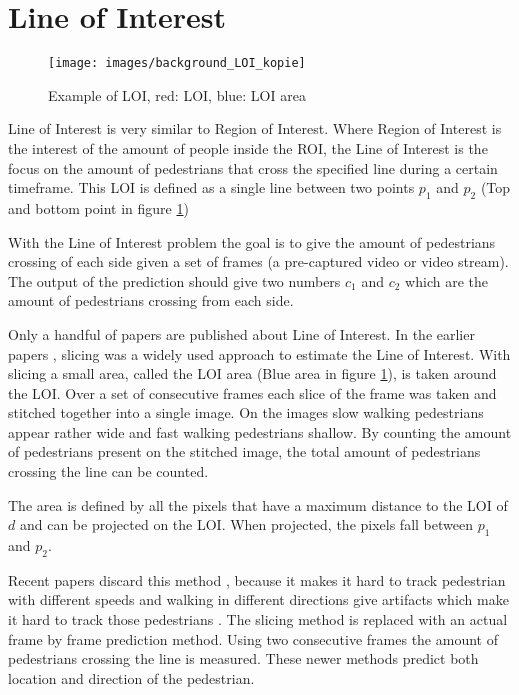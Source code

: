 \section{Line of Interest}
\begin{figure}[h]
\centering
\texttt{[image: images/background\_LOI\_kopie]}
\caption{Example of LOI, red: LOI, blue: LOI area}
\label{fig:loi_example}
\end{figure}

Line of Interest is very similar to Region of Interest. Where Region of Interest is the interest of the amount of people inside the ROI, the Line of Interest is the focus on the amount of pedestrians that cross the specified line during a certain timeframe. This LOI is defined as a single line between two points $p_1$ and $p_2$ (Top and bottom point in figure \ref{fig:loi_example})

With the Line of Interest problem the goal is to give the amount of pedestrians crossing of each side given a set of frames (a pre-captured video or video stream). The output of the prediction should give two numbers $c_1$ and $c_2$ which are the amount of pedestrians crossing from each side.

Only a handful of papers are published about Line of Interest. In the earlier papers \cite{ma_counting_2016, cao_large_2015}, slicing was a widely used approach to estimate the Line of Interest. With slicing a small area, called the LOI area (Blue area in figure \ref{fig:loi_example}), is taken around the LOI. Over a set of consecutive frames each slice of the frame was taken and stitched together into a single image. On the images slow walking pedestrians appear rather wide and fast walking pedestrians shallow. By counting the amount of pedestrians present on the stitched image, the total amount of pedestrians crossing the line can be counted.

The area is defined by all the pixels that have a maximum distance to the LOI of $d$ and can be projected on the LOI. When projected, the pixels fall between $p_1$ and $p_2$.

Recent papers discard this method \cite{leibe_crossing-line_2016, zheng_cross-line_2019}, because it makes it hard to track pedestrian with different speeds and walking in different directions give artifacts which make it hard to track those pedestrians \cite{leibe_crossing-line_2016}. The slicing method is replaced with an actual frame by frame prediction method. Using two consecutive frames the amount of pedestrians crossing the line is measured. These newer methods predict both location and direction of the pedestrian.

